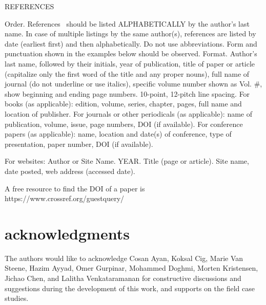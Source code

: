 \documentclass[10pt,twocolumn,twoside]{article}
\begin{document}
REFERENCES

Order. References~\citep{Archie1942} should be listed ALPHABETICALLY by the author’s last name. In case of multiple listings by the same author(s), references are listed by date (earliest first) and then alphabetically. Do not use abbreviations. Form and punctuation shown in the examples below should be observed.
Format. Author's last name, followed by their initials, year of publication, title of paper or article (capitalize only the first word of the title and any proper nouns), full name of journal (do not underline or use italics), specific volume number shown as Vol. \#, show beginning and ending page numbers. 10-point, 12-pitch line spacing.
For books (as applicable): edition, volume, series, chapter, pages, full name and location of publisher.
For journals or other periodicals (as applicable): name of publication, volume, issue, page numbers, DOI (if available).
For conference papers (as applicable): name, location and date(s) of conference, type of presentation, paper number, DOI (if available). 

For websites: Author or Site Name. YEAR. Title (page or article). Site name, date posted, web address (accessed date). 

A free resource to find the DOI of a paper is https://www.crossref.org/guestquery/ 


\section{acknowledgments}
The authors would like to acknowledge Cosan Ayan, Koksal Cig, Marie Van Steene, Hazim Ayyad, Omer Gurpinar, Mohammed Doghmi, Morten Kristensen, Jichao Chen, and Lalitha Venkataramanan for constructive discussions and suggestions during the development of this work, and supports on the field case studies.


\end{document}
